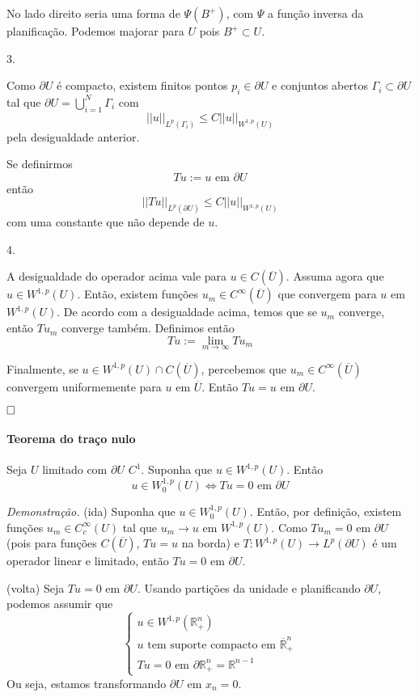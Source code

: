\documentclass[11pt]{article}
\newcommand{\qed}{$\hfill\square$}
\newcommand{\R}{\mathbb{R}}
\newcommand{\p}{\partial}
\newcommand{\pu}{\partial U}
\begin{document}
No lado direito seria uma forma de $\Psi(B^+)$, com $\Psi$ a função inversa da planificação. Podemos majorar para $U$ pois $B^+ \subset U$.

3.

Como $\pu$ é compacto, existem finitos pontos $p_i \in \pu$ e conjuntos abertos $\Gamma_i \subset \pu$ tal que $\pu = \bigcup_{i=1}^N \Gamma_i$ com \[ ||u||_{L^p(\Gamma_i)} \leq C ||u||_{W^{1,p}(U)} \] pela desigualdade anterior.

Se definirmos \[ Tu := u \text{ em } \pu \] então \[ ||Tu||_{L^p(\pu)} \leq C ||u||_{W^{1,p}(U)} \] com uma constante que não depende de $u$.


4.

A desigualdade do operador acima vale para $u \in C(\overline{U})$. Assuma agora que $u \in W^{1,p}(U)$. Então, existem funções $u_m \in C^\infty (\overline{U})$ que convergem para $u$ em $W^{1,p}(U)$. De acordo com a desigualdade acima, temos que se $u_m$ converge, então $Tu_m$ converge também. Definimos então \[ Tu := \lim_{m\rightarrow \infty} Tu_m \] 

Finalmente, se $u \in W^{1,p}(U) \cap C(\overline{U})$, percebemos que $u_m \in C^\infty(\overline{U})$ convergem uniformemente para $u$ em $\overline{U}$. Então $Tu=u$ em $\pu$.

\qed






\paragraph{Teorema do traço nulo} Seja $U$ limitado com $\pu$ $C^1$. Suponha que $u \in W^{1,p}(U)$. Então \[ u \in W^{1,p}_0(U) \Leftrightarrow Tu =0 \text{ em } \pu \]

\textit{Demonstração.} (ida) Suponha que $ u \in W^{1,p}_0(U) $. Então, por definição, existem funções $ u_m \in C^\infty_c(U) $ tal que $ u_m\rightarrow u $ em $ W^{1,p}(U) $. Como $ Tu_m=0 $ em $ \pu $ (pois para funções $ C(\overline{U}) $, $ Tu=u $ na borda) e $ T:W^{1,p}(U)\rightarrow L^p(\pu) $ é um operador linear e limitado, então $ Tu=0 $ em $ \pu $.

(volta) Seja $ Tu=0 \text{ em } \pu $. Usando partições da unidade e planificando $ \pu $, podemos assumir que \[ \begin{cases}
	u \in W^{1,p}(\R^n_+) \\
	u \text{ tem suporte compacto em } \overline{\R}^n_+\\
	Tu=0 \text{ em } \p\R^n_+ = \R^{n-1}
\end{cases} \] Ou seja, estamos transformando $ \pu $ em $ {x_n=0} $.
\end{document}
